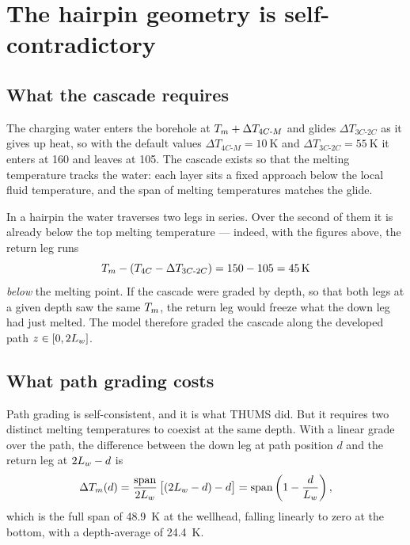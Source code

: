 \section{The hairpin geometry is self-contradictory}
\label{sec:hairpin}

\subsection{What the cascade requires}

The charging water enters the borehole at $T_{m} + \Delta T_{4C\text{-}M}$ and
glides $\Delta T_{3C\text{-}2C}$ as it gives up heat, so with the default
values $\Delta T_{4C\text{-}M} = \SI{10}{\kelvin}$ and
$\Delta T_{3C\text{-}2C} = \SI{55}{\kelvin}$ it enters at \SI{160}{\degC} and
leaves at \SI{105}{\degC}. The cascade exists so that the melting temperature
tracks the water: each layer sits a fixed approach below the local fluid
temperature, and the span of melting temperatures matches the glide.

In a hairpin the water traverses two legs in series. Over the second of them
it is already below the top melting temperature --- indeed, with the figures
above, the return leg runs
\begin{equation}
\Tm - (T_{4C} - \Delta T_{3C\text{-}2C}) = 150 - 105 = \SI{45}{\kelvin}
\end{equation}
\emph{below} the melting point. If the cascade were graded by depth, so that
both legs at a given depth saw the same $T_{m}$, the return leg would freeze what
the down leg had just melted. The model therefore graded the cascade along the
developed path $z \in [0, 2L_{w}]$.

\subsection{What path grading costs}

Path grading is self-consistent, and it is what THUMS did. But it requires two
distinct melting temperatures to coexist at the same depth. With a linear
grade over the path, the difference between the down leg at path position $d$
and the return leg at $2L_{w} - d$ is
\begin{equation}
\Delta T_{m}(d) = \frac{\text{span}}{2L_{w}}\,\big[(2L_{w} - d) - d\big]
  = \text{span}\left(1 - \frac{d}{L_{w}}\right),
\end{equation}
which is the full span of \SI{48.9}{\kelvin} at the wellhead, falling linearly
to zero at the bottom, with a depth-average of \SI{24.4}{\kelvin}.

